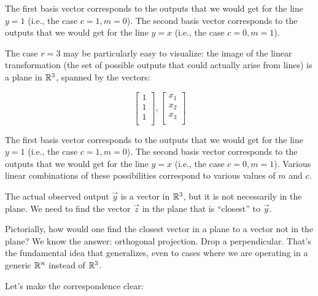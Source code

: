 \documentclass[10pt]{amsart}
\begin{document}
The first basis vector corresponds to the outputs that we would get
for the line $y = 1$ (i.e., the case $ c = 1, m = 0$).  The second
basis vector corresponds to the outputs that we would get for the line
$y = x$ (i.e., the case $c=0,m=1$).

The case $r = 3$ may be particularly easy to visualize: the image of
the linear transformation (the set of possible outputs that could
actually arise from lines) is a plane in $\mathbb{R}^3$, spanned by the vectors:

$$\left[\begin{matrix} 1 \\ 1 \\ 1 \\\end{matrix}\right], \left[\begin{matrix} x_1 \\ x_2 \\ x_3 \\\end{matrix}\right]$$

The first basis vector corresponds to the outputs that we would get
for the line $y = 1$ (i.e., the case $ c = 1, m = 0$).  The second
basis vector corresponds to the outputs that we would get for the line
$y = x$ (i.e., the case $c=0,m=1$). Various linear combinations
of these possibilities correspond to various values of $m$ and $c$.

The actual observed output $\vec{y}$ is a vector in $\mathbb{R}^3$, but it is
not necessarily in the plane. We need to find the vector $\vec{z}$ in
the plane that is ``closest'' to $\vec{y}$.

Pictorially, how would one find the closest vector in a plane to a
vector not in the plane? We know the answer: orthogonal
projection. Drop a perpendicular. That's the fundamental idea that
generalizes, even to cases where we are operating in a generic $\mathbb{R}^n$
instead of $\mathbb{R}^3$.

Let's make the correspondence clear:
\end{document}
